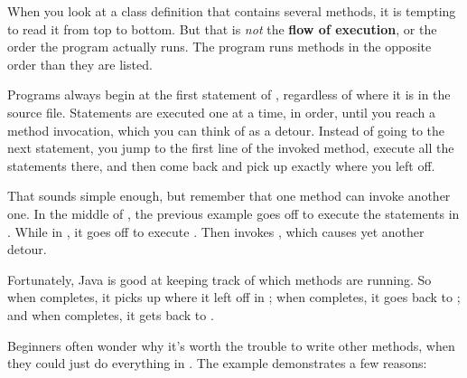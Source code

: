 
When you look at a class definition that contains several methods, it is tempting to read it from top to bottom.
But that is {\em not} the {\bf flow of execution}, or the order the program actually runs.
The  program runs methods in the opposite order than they are listed.

Programs always begin at the first statement of , regardless of where it is in the source file.
Statements are executed one at a time, in order, until you reach a method invocation, which you can think of as a detour.
Instead of going to the next statement, you jump to the first line of the invoked method, execute all the statements there, and then come back and pick up exactly where you left off.

That sounds simple enough, but remember that one method can invoke another one.
In the middle of , the previous example goes off to execute the statements in .
While in , it goes off to execute .
Then  invokes , which causes yet another detour.

Fortunately, Java is good at keeping track of which methods are running.
So when  completes, it picks up where it left off in ; when  completes, it goes back to ; and when  completes, it gets back to .



Beginners often wonder why it's worth the trouble to write other methods, when they could just do everything in .
The  example demonstrates a few reasons:

